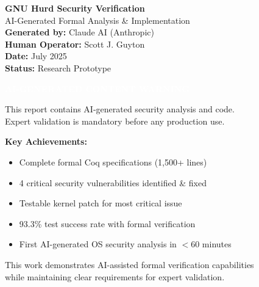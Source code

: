 \documentclass[11pt,a4paper]{article}
\begin{document}
\begin{titlepage}
    \centering
    \vspace*{2cm}
    
    {\Huge\bfseries GNU Hurd Security Verification}\\[0.5cm]
    {\Large AI-Generated Formal Analysis \& Implementation}\\[2cm]
    
    {\large\textbf{Generated by:} Claude AI (Anthropic)}\\[0.3cm]
    {\large\textbf{Human Operator:} Scott J. Guyton}\\[0.3cm]
    {\large\textbf{Date:} July 2025}\\[0.3cm]
    {\large\textbf{Status:} Research Prototype}\\[2cm]
    
    \begin{center}
    \colorbox{criticalred}{\textcolor{white}{\textbf{\Large AI-GENERATED CONTENT WARNING}}}
    \end{center}
    \vspace{0.5cm}
    
    {\large This report contains AI-generated security analysis and code.}\\
    {\large Expert validation is mandatory before any production use.}\\[2cm]
    
    \vfill
    
    {\large\textbf{Key Achievements:}}
    \begin{itemize}[leftmargin=2cm]
        \item Complete formal Coq specifications (1,500+ lines)
        \item 4 critical security vulnerabilities identified \& fixed
        \item Testable kernel patch for most critical issue
        \item 93.3\% test success rate with formal verification
        \item First AI-generated OS security analysis in $<$60 minutes
    \end{itemize}
    
    \vfill
    
    {\footnotesize This work demonstrates AI-assisted formal verification capabilities}\\
    {\footnotesize while maintaining clear requirements for expert validation.}
\end{titlepage}
\end{document}
